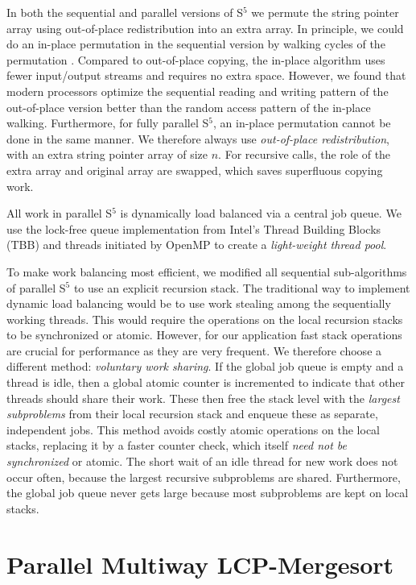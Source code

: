 \documentclass[a4paper]{myjournal}
\begin{document}
In both the sequential and parallel versions of S$^5$ we permute the string
pointer array using out-of-place redistribution into an extra array. In
principle, we could do an in-place permutation in the sequential version by
walking cycles of the permutation \cite{mcilroy1993engineering}. Compared to
out-of-place copying, the in-place algorithm uses fewer input/output streams and
requires no extra space. However, we found that modern processors optimize the
sequential reading and writing pattern of the out-of-place version better than
the random access pattern of the in-place walking. Furthermore, for fully
parallel S$^5$, an in-place permutation cannot be done in the same manner.  We
therefore always use \emph{out-of-place redistribution}, with an extra string
pointer array of size $n$. For recursive calls, the role of the extra array and
original array are swapped, which saves superfluous copying work.

All work in parallel S$^5$ is dynamically load balanced via a central job
queue. We use the lock-free queue implementation from Intel's Thread Building
Blocks (TBB) and threads initiated by OpenMP to create a \emph{light-weight
  thread pool}.

To make work balancing most efficient, we modified all sequential
sub-al\-go\-rithms of parallel S$^5$ to use an explicit recursion stack. The
traditional way to implement dynamic load balancing would be to use work
stealing among the sequentially working threads. This would require the
operations on the local recursion stacks to be synchronized or atomic. However,
for our application fast stack operations are crucial for performance as they
are very frequent. We therefore choose a different method: \emph{voluntary work
  sharing}. If the global job queue is empty and a thread is idle, then a global
atomic counter is incremented to indicate that other threads should share their
work. These then free the stack level with the \emph{largest subproblems} from
their local recursion stack and enqueue these as separate, independent
jobs. This method avoids costly atomic operations on the local stacks, replacing
it by a faster counter check, which itself \emph{need not be synchronized} or
atomic. The short wait of an idle thread for new work does not occur often,
because the largest recursive subproblems are shared. Furthermore, the global
job queue never gets large because most subproblems are kept on local stacks.

\section{Parallel Multiway LCP-Mergesort}\label{sec:para-mergesort}
\end{document}
